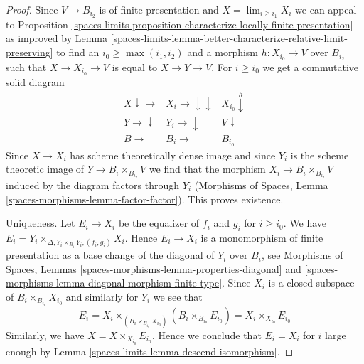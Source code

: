 \begin{proof}
Since $V \to B_{i_2}$ is of finite presentation and
$X = \lim_{i \geq i_1} X_i$ we can appeal to Proposition
\ref{spaces-limits-proposition-characterize-locally-finite-presentation}
as improved by Lemma \ref{spaces-limits-lemma-better-characterize-relative-limit-preserving}
to find an $i_0 \geq \max(i_1, i_2)$ and a morphism $h : X_{i_0} \to V$
over $B_{i_2}$ such that $X \to X_{i_0} \to V$ is equal to $X \to Y \to V$.
For $i \geq i_0$ we get a commutative solid diagram
$$
\begin{array}{ccc}X \downarrow\longrightarrow & X_i \longrightarrow\downarrow\downarrow & X_{i_0} \overset{h}{\downarrow} \\ Y \longrightarrow\downarrow & Y_i \longrightarrow\downarrow & V \downarrow \\ B \longrightarrow & B_i \longrightarrow & B_{i_0}\end{array}
$$
Since $X \to X_i$ has scheme theoretically dense image
and since $Y_i$ is the scheme theoretic image of
$Y \to B_i \times_{B_{i_2}} V$
we find that the morphism $X_i \to B_i \times_{B_{i_2}} V$
induced by the diagram factors through $Y_i$
(Morphisms of Spaces, Lemma \ref{spaces-morphisms-lemma-factor-factor}).
This proves existence.

\medskip\noindent
Uniqueness. Let $E_i \to X_i$ be the equalizer of $f_i$ and $g_i$
for $i \geq i_0$. We have
$E_i = Y_i \times_{\Delta, Y_i \times_{B_i} Y_i, (f_i, g_i)} X_i$.
Hence $E_i \to X_i$ is a monomorphism of finite presentation as a base
change of the diagonal of $Y_i$ over $B_i$, see
Morphisms of Spaces, Lemmas \ref{spaces-morphisms-lemma-properties-diagonal} and
\ref{spaces-morphisms-lemma-diagonal-morphism-finite-type}.
Since $X_i$ is a closed subspace of $B_i \times_{B_{i_0}} X_{i_0}$
and similarly for $Y_i$ we see that
$$
E_i =
X_i \times_{(B_i \times_{B_{i_0}} X_{i_0})} (B_i \times_{B_{i_0}} E_{i_0}) =
X_i \times_{X_{i_0}} E_{i_0}
$$
Similarly, we have $X = X \times_{X_{i_0}} E_{i_0}$. Hence we conclude
that $E_i = X_i$ for $i$ large enough by Lemma \ref{spaces-limits-lemma-descend-isomorphism}.
\end{proof}

